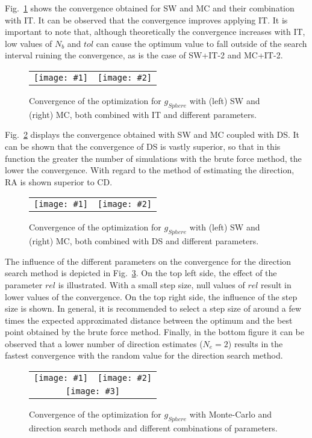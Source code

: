 \documentclass[review,authoryear]{elsarticle}
\newcommand{\PLOTII}[4]
{
	\begin{figure}[ht!]
		\centering
		\begin{tabular}{cc}
			\texttt{[image: \#1]} & \texttt{[image: \#2]}
		\end{tabular}
		\caption{#3.\label{#4}}
	\end{figure}
}
\newcommand{\FIGIII}[5]
{
	\begin{figure}[ht!]
		\centering
		\begin{tabular}{cc}
			\texttt{[image: \#1]} & \texttt{[image: \#2]} \\
			\multicolumn{2}{c}{\texttt{[image: \#3]}}
		\end{tabular}
		\caption{#4.\label{#5}}
	\end{figure}
}
\begin{document}
Fig.~\ref{FigSphereSWMC} shows the convergence obtained for SW and MC and their
combination with IT. It can
be observed that the convergence improves applying IT. It is important
to note that, although theoretically the convergence increases with IT, 
low values of $N_b$ and $tol$ can cause the optimum value to fall outside of the search
interval ruining the convergence, as is the case of SW+IT-2 and MC+IT-2.
\PLOTII{sphere-evolution-sw.eps}{sphere-evolution-mc.eps}
{Convergence of the optimization for $g_{Sphere}$ with (left) SW and (right) MC,
both combined with IT and different parameters}{FigSphereSWMC}

Fig.~\ref{FigSphereSWMCGR} displays the convergence obtained with SW and MC
coupled with DS. It can be shown that the convergence of DS is vastly superior,
so that in this function the greater the number of simulations with 
the brute force method, the lower the convergence. With regard to the method of
estimating the direction, RA is shown superior to CD.
\PLOTII{sphere-evolution-sw-cdr.eps}{sphere-evolution-mc-cdr.eps}
{Convergence of the optimization for $g_{Sphere}$ with (left) SW and (right) MC,
both combined with DS and different parameters}{FigSphereSWMCGR}

The influence of the different parameters on the convergence for the direction
search method is depicted in Fig.~\ref{FigSphereMCCDR}.
On the top left side, the effect of the parameter $rel$ is illustrated. With a
small step size, null values of $rel$ result in lower values of the convergence.
On the top right side, the influence of the step size is shown. In general,
it is recommended to select a step size of around a few times the expected 
approximated distance between the optimum and the best point obtained by the brute
force method. Finally, in the bottom figure it can be observed that a lower number of direction
estimates ($N_e=2$) results in the fastest convergence with the random value for the
direction search method. 
\FIGIII{sphere-evolution-mc-cd-r.eps}{sphere-evolution-mc-cd-s.eps}
{sphere-evolution-mc-r.eps}
{Convergence of the optimization for $g_{Sphere}$ with Monte-Carlo and direction
search methods and different combinations of parameters}{FigSphereMCCDR}
 
\end{document}
